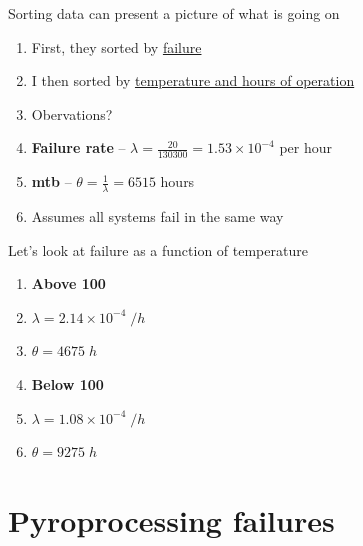 \documentclass[aspectratio=1610,pdftex,dvipsnames,compress,xcolor={dvipsnames}]{beamer}
\newcommand{\acf}{\acrfull} %
\begin{document}
\addtocounter{framenumber}{-1}
\begin{frame}{Sorting data can present a picture of what is going on}
    \begin{enumerate}[series=outerlist,topsep=0pt,itemsep=17pt,leftmargin=*,label=(\arabic*)]
        \item[]First, they sorted by \href{https://docs.google.com/spreadsheets/d/1iNBowXJOa8Da4_TxbC0iFPxhtJtCSlNWTEF8rtCHdbI/edit?usp=sharing}{failure}
        \item[]I then sorted by \href{https://docs.google.com/spreadsheets/d/1MLsXFbCZcbv1Atahns1xxBUEvodaqZh2DdBCWs13oN4/edit?usp=sharing}{temperature and hours of operation}
        \item[]Obervations?
        \item[]\textbf{Failure rate} -- $\lambda = \frac{20}{130300}=1.53 \times 10^{-4}$ per hour
        \item[]\textbf{\acf{mtb}} -- $\theta = \frac{1}{\lambda} = 6515$ hours 
        \item[]Assumes all systems fail in the same way
    \end{enumerate}
\end{frame}


\begin{frame}{Let's look at failure as a function of temperature}
    \begin{enumerate}[series=outerlist,topsep=0pt,itemsep=7pt,leftmargin=*,label=(\arabic*)]
        \item[]\textbf{Above 100}
        \item[]$\lambda = 2.14 \times 10^{-4} \; /h$
        \item[]$\theta = 4675 \; h$
            \vspace{0.15in}
        \item[]\textbf{Below 100}
        \item[]$\lambda = 1.08 \times 10^{-4} \; /h $
        \item[]$\theta = 9275 \; h$
    \end{enumerate}
\end{frame}


\section{Pyroprocessing failures}
\end{document}
